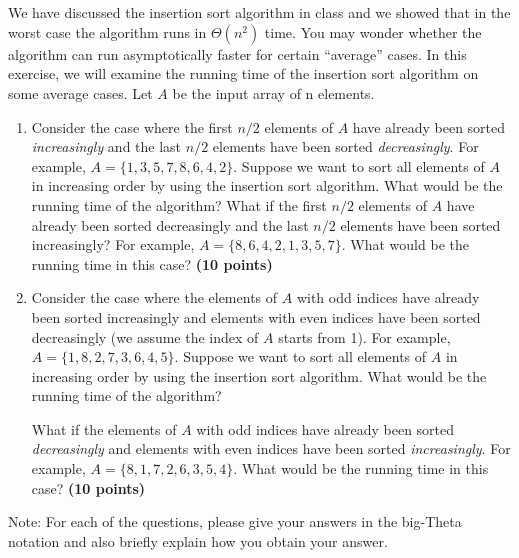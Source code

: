 \documentclass{article}
\begin{document}
\section{}
We have discussed the insertion sort algorithm in class and we showed
that in the worst case the algorithm runs in $\Theta(n^2)$ time. You
may wonder whether the algorithm can run asymptotically faster for
certain ``average'' cases. In this exercise, we will examine the running
time of the insertion sort algorithm on some average cases. Let $A$ be 
the input array of n elements.
\begin{enumerate}[label=(\alph*)]
\item Consider the case where the first $n/2$ elements of $A$ have
already been sorted \emph{increasingly} and the last $n/2$ elements
have been sorted \emph{decreasingly}. For example, $A = \{1, 3, 5, 7,
8, 6, 4, 2\}$. Suppose we want to sort all elements of $A$ in
increasing order by using the insertion sort algorithm. What would be
the running time of the algorithm? What if the first $n/2$ elements of
$A$ have already been sorted decreasingly and the last $n/2$ elements
have been sorted increasingly? For example, $A = \{8, 6, 4, 2, 1, 3,
5, 7\}$. What would be the running time in this case? {\bf (10 points)}

\item Consider the case where the elements of $A$ with odd indices have
already been sorted increasingly and elements with even indices have
been sorted decreasingly (we assume the index of $A$ starts from
1). For example, $A = \{1, 8, 2, 7, 3, 6, 4, 5\}$. Suppose we want to
sort all elements of $A$ in increasing order by using the insertion
sort algorithm. What would be the running time of the algorithm?

What if the elements of $A$ with odd indices have already been sorted
\emph{decreasingly} and elements with even indices have been sorted 
\emph{increasingly}. For example, $A = \{8, 1, 7, 2, 6, 3, 5,
4\}$. What would be the running time in this case?  {\bf (10 points)}
\end{enumerate}

Note: For each of the questions, please give your answers in the
big-Theta notation and also briefly explain how you obtain your answer.
\end{document}
